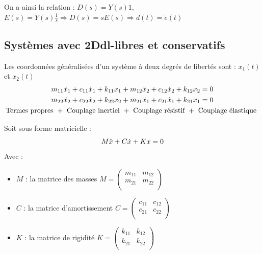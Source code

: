 \documentclass[../main.tex]{subfiles}
\begin{document}
On a ainsi la relation : $D(s) = Y(s)1$, $E(s) = Y(s) \frac{1}{s} \Rightarrow D(s) = sE(s) \Rightarrow d(t) = \dot{e}(t)$\\

\subsection{Systèmes avec 2Ddl-libres et conservatifs}
Les coordonnées généralisées d'un système à deux degrés de libertés sont : $x_1(t)$ et $x_2(t)$\\

\begin{equation}
    \begin{gathered}
        m_{11}\Ddot{x}_{1} + c_{11} \dot{x}_{1} + k_{11} x_{1} + m_{12}\Ddot{x}_{2} + c_{12} \dot{x}_{2} + k_{12} x_2 = 0\\
        m_{22}\Ddot{x}_{2} + c_{22} \dot{x}_{2} + k_{22} x_{2} + m_{21}\Ddot{x}_{1} + c_{21} \dot{x}_{1} + k_{21} x_1 = 0\\
        \text{Termes propres }+ \text{ Couplage inertiel } + \text{ Couplage résistif } + \text{ Couplage élastique }\\
    \end{gathered}
\end{equation}

Soit sous forme matricielle : \begin{equation}
    M \Ddot{x} + C \dot{x} + Kx = 0
\end{equation}
Avec : \begin{itemize}
    \item $M$ : la matrice des masses $M = \begin{pmatrix}
        m_{11} & m_{12}\\ m_{21} & m_{22}\\
    \end{pmatrix}$\\
    \item $C$ : la matrice d'amortissement $C = \begin{pmatrix}
        c_{11} & c_{12}\\ c_{21} & c_{22}\\
    \end{pmatrix}$\\
    \item $K$ : la matrice de rigidité $K = \begin{pmatrix}
        k_{11} & k_{12}\\ k_{21} & k_{22}\\
    \end{pmatrix}$\\
\end{itemize}
\end{document}
